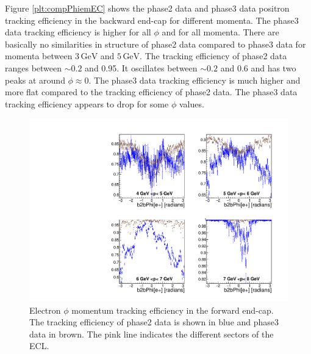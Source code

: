 \documentclass[a4paper,11pt,twosided,final,german,openbib,pdftex,listof=totoc,bibliography=totoc]{scrbook}
\begin{document}
Figure \ref{plt:compPhiemEC} shows the phase2 data and phase3 data positron tracking efficiency in the backward end-cap for different momenta.
The phase3 data tracking efficiency is higher for all $\phi$ and for all momenta.
There are basically no similarities in structure of phase2 data compared to phase3 data for momenta between $3\,\textrm{GeV}$ and $5\,\textrm{GeV}$. The tracking efficiency of phase2 data ranges between $\sim 0.2$ and 0.95. It oscillates between $\sim 0.2$ and 0.6 and has two peaks at around $\phi \approx 0$.
The phase3 data tracking efficiency is much higher and more flat compared to the tracking efficiency of phase2 data. The phase3 data tracking efficiency appears to drop for some $\phi$ values.



\begin{figure}[!htbp]
	\centering
	\includegraphics[width=\textwidth]{Plots/comp/cMPhiemFC_Data.pdf}
	\caption[Momentum $\phi$ Electron Efficiency Forward End-Cap Phase2 And Phase3 Data]{Electron $\phi$ momentum tracking efficiency in the forward end-cap. The tracking efficiency of phase2 data is shown in blue and phase3 data in brown. The pink line indicates the different sectors of the ECL.}
	\label{plt:compPhiemFC}
\end{figure}
\end{document}

